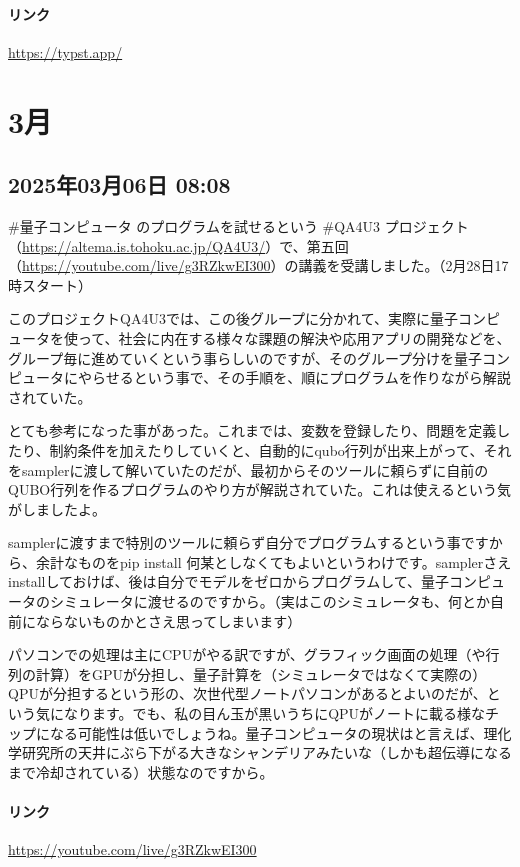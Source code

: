 \paragraph{リンク}
\url{https://typst.app/}

\section{3月}

\subsection*{2025年03月06日 08:08}

\#量子コンピュータ のプログラムを試せるという \#QA4U3 プロジェクト（\url{https://altema.is.tohoku.ac.jp/QA4U3/}）で、第五回（\url{https://youtube.com/live/g3RZkwEI300}）の講義を受講しました。（2月28日17時スタート）

このプロジェクトQA4U3では、この後グループに分かれて、実際に量子コンピュータを使って、社会に内在する様々な課題の解決や応用アプリの開発などを、グループ毎に進めていくという事らしいのですが、そのグループ分けを量子コンピュータにやらせるという事で、その手順を、順にプログラムを作りながら解説されていた。

とても参考になった事があった。これまでは、変数を登録したり、問題を定義したり、制約条件を加えたりしていくと、自動的にqubo行列が出来上がって、それをsamplerに渡して解いていたのだが、最初からそのツールに頼らずに自前のQUBO行列を作るプログラムのやり方が解説されていた。これは使えるという気がしましたよ。

samplerに渡すまで特別のツールに頼らず自分でプログラムするという事ですから、余計なものをpip install 何某としなくてもよいというわけです。samplerさえinstallしておけば、後は自分でモデルをゼロからプログラムして、量子コンピュータのシミュレータに渡せるのですから。（実はこのシミュレータも、何とか自前にならないものかとさえ思ってしまいます）

パソコンでの処理は主にCPUがやる訳ですが、グラフィック画面の処理（や行列の計算）をGPUが分担し、量子計算を（シミュレータではなくて実際の）QPUが分担するという形の、次世代型ノートパソコンがあるとよいのだが、という気になります。でも、私の目ん玉が黒いうちにQPUがノートに載る様なチップになる可能性は低いでしょうね。量子コンピュータの現状はと言えば、理化学研究所の天井にぶら下がる大きなシャンデリアみたいな（しかも超伝導になるまで冷却されている）状態なのですから。

\paragraph{リンク}
\url{https://youtube.com/live/g3RZkwEI300}

